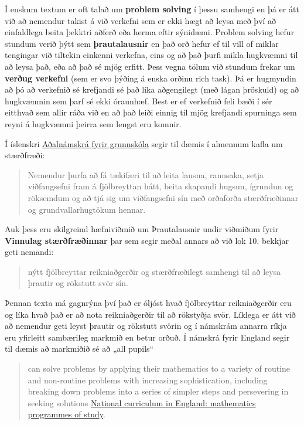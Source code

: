 \documentclass[
  icelandic,
]{book}
\begin{document}
Í enskum textum er oft talað um \textbf{problem solving} í þessu samhengi en þá er átt við að nemendur takist á við verkefni sem er ekki hægt að leysa með því að einfaldlega beita þekktri aðferð eða herma eftir sýnidæmi. Problem solving hefur stundum verið þýtt sem \textbf{þrautalausnir} en það orð hefur ef til vill of miklar tengingar við tiltekin einkenni verkefna, eins og að það þurfi mikla hugkvæmni til að leysa það, eða að það sé mjög erfitt. Þess vegna tölum við stundum frekar um \textbf{verðug verkefni} (sem er svo þýðing á enska orðinu rich task). Þá er hugmyndin að þó að verkefnið sé krefjandi sé það líka aðgengilegt (með lágan þröskuld) og að hugkvæmnin sem þarf sé ekki óraunhæf. Best er ef verkefnið feli bæði í sér eitthvað sem allir ráða við en að það leiði einnig til mjög krefjandi spurninga sem reyni á hugkvæmni þeirra sem lengst eru komnir.

Í íslenskri \href{https://www.adalnamskra.is/grunnskoli/kafli-25-staerdfraedi-2024}{Aðalnámskrá fyrir grunnskóla} segir til dæmis í almennum kafla um stærðfræði:

\begin{quote}
Nemendur þurfa að fá tækifæri til að leita lausna, rannsaka, setja viðfangsefni fram á fjölbreyttan hátt, beita skapandi hugsun, ígrundun og röksemdum og að tjá sig um viðfangsefni sín með orðaforða stærðfræðinnar og grundvallarhugtökum hennar.
\end{quote}

Auk þess eru skilgreind hæfniviðmið um Þrautalausnir undir viðmiðum fyrir \textbf{Vinnulag stærðfræðinnar} þar sem segir meðal annars að við lok 10. bekkjar geti nemandi:

\begin{quote}
nýtt fjölbreyttar reikniaðgerðir og stærðfræðilegt samhengi til að leysa þrautir og rökstutt svör sín.
\end{quote}

Þennan texta má gagnrýna því það er óljóst hvað fjölbreyttar reikniaðgerðir eru og líka hvað það er að nota reikniaðgerðir til að rökstyðja svör. Líklega er átt við að nemendur geti leyst þrautir og rökstutt svörin og í námskrám annarra ríkja eru yfirleitt sambærileg markmið en betur orðuð. Í námskrá fyrir England segir til dæmis að markmiðið sé að „all pupils``

\begin{quote}
can solve problems by applying their mathematics to a variety of routine and non-routine problems with increasing sophistication, including breaking down problems into a series of simpler steps and persevering in seeking solutions \href{https://www.gov.uk/government/publications/national-curriculum-in-england-mathematics-programmes-of-study/national-curriculum-in-england-mathematics-programmes-of-study}{National curriculum in England: mathematics programmes of study}.
\end{quote}
\end{document}
